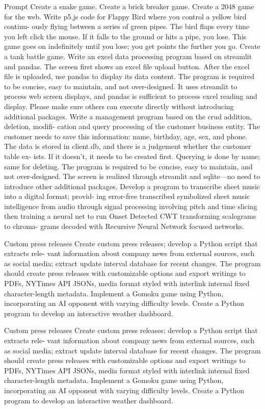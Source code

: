 \documentclass[12pt]{article}
\begin{document}
Prompt
Create a snake game.
Create a brick breaker game.
Create a 2048 game for the web.
Write p5.js code for Flappy Bird where you control a yellow bird continu-
ously flying between a series of green pipes. The bird flaps every time you
left click the mouse. If it falls to the ground or hits a pipe, you lose. This
game goes on indefinitely until you lose; you get points the further you go.
Create a tank battle game.
Write an excel data processing program based on streamlit and pandas. The
screen first shows an excel file upload button. After the excel file is uploaded,
use pandas to display its data content. The program is required to be concise,
easy to maintain, and not over-designed. It uses streamlit to process web
screen displays, and pandas is sufficient to process excel reading and display.
Please make sure others can execute directly without introducing additional
packages.
Write a management program based on the crud addition, deletion, modifi-
cation and query processing of the customer business entity. The customer
needs to save this information: name, birthday, age, sex, and phone. The data
is stored in client.db, and there is a judgement whether the customer table ex-
ists. If it doesn’t, it needs to be created first. Querying is done by name; same
for deleting. The program is required to be concise, easy to maintain, and not
over-designed. The screen is realized through streamlit and sqlite—no need
to introduce other additional packages.
Develop a program to transcribe sheet music into a digital format; provid-
ing error-free transcribed symbolized sheet music intelligence from audio
through signal processing involving pitch and time slicing then training a
neural net to run Onset Detected CWT transforming scalograms to chroma-
grams decoded with Recursive Neural Network focused networks.


Custom press releases Create custom press releases; develop a Python script that extracts rele-
vant information about company news from external sources, such as social
media; extract update interval database for recent changes. The program
should create press releases with customizable options and export writings
to PDFs, NYTimes API JSONs, media format styled with interlink internal
fixed character-length metadata.
Implement a Gomoku game using Python, incorporating an AI opponent
with varying difficulty levels.
Create a Python program to develop an interactive weather dashboard.


Custom press releases Create custom press releases; develop a Python script that extracts rele-
vant information about company news from external sources, such as social
media; extract update interval database for recent changes. The program
should create press releases with customizable options and export writings
to PDFs, NYTimes API JSONs, media format styled with interlink internal
fixed character-length metadata.
Implement a Gomoku game using Python, incorporating an AI opponent
with varying difficulty levels.
Create a Python program to develop an interactive weather dashboard.
\end{document}
